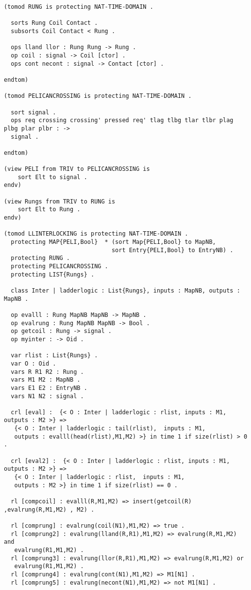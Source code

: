 \documentclass{article}
\begin{document}
\begin{verbatim}
(tomod RUNG is protecting NAT-TIME-DOMAIN .
  
  sorts Rung Coil Contact .
  subsorts Coil Contact < Rung .

  ops lland llor : Rung Rung -> Rung .
  op coil : signal -> Coil [ctor] .
  ops cont necont : signal -> Contact [ctor] .

endtom)

(tomod PELICANCROSSING is protecting NAT-TIME-DOMAIN .
 
  sort signal .
  ops req crossing crossing' pressed req' tlag tlbg tlar tlbr plag plbg plar plbr : -> 
  signal .

endtom)

(view PELI from TRIV to PELICANCROSSING is
    sort Elt to signal .
endv)

(view Rungs from TRIV to RUNG is
    sort Elt to Rung .
endv)

(tomod LLINTERLOCKING is protecting NAT-TIME-DOMAIN . 
  protecting MAP{PELI,Bool}  * (sort Map{PELI,Bool} to MapNB,
                               sort Entry{PELI,Bool} to EntryNB) .
  protecting RUNG .
  protecting PELICANCROSSING .
  protecting LIST{Rungs} .

  class Inter | ladderlogic : List{Rungs}, inputs : MapNB, outputs : MapNB .
  
  op evalll : Rung MapNB MapNB -> MapNB .
  op evalrung : Rung MapNB MapNB -> Bool .
  op getcoil : Rung -> signal .  
  op myinter : -> Oid .

  var rlist : List{Rungs} .
  var O : Oid .
  vars R R1 R2 : Rung .
  vars M1 M2 : MapNB .
  vars E1 E2 : EntryNB .
  vars N1 N2 : signal .

  crl [eval] :  {< O : Inter | ladderlogic : rlist, inputs : M1, outputs : M2 >} => 
   {< O : Inter | ladderlogic : tail(rlist),  inputs : M1, 
   outputs : evalll(head(rlist),M1,M2) >} in time 1 if size(rlist) > 0 .

  crl [eval2] :  {< O : Inter | ladderlogic : rlist, inputs : M1, outputs : M2 >} => 
   {< O : Inter | ladderlogic : rlist,  inputs : M1, 
   outputs : M2 >} in time 1 if size(rlist) == 0 .
  
  rl [compcoil] : evalll(R,M1,M2) => insert(getcoil(R) ,evalrung(R,M1,M2) , M2) .
  
  rl [comprung] : evalrung(coil(N1),M1,M2) => true .
  rl [comprung2] : evalrung(lland(R,R1),M1,M2) => evalrung(R,M1,M2) and 
   evalrung(R1,M1,M2) .
  rl [comprung3] : evalrung(llor(R,R1),M1,M2) => evalrung(R,M1,M2) or
   evalrung(R1,M1,M2) .
  rl [comprung4] : evalrung(cont(N1),M1,M2) => M1[N1] .
  rl [comprung5] : evalrung(necont(N1),M1,M2) => not M1[N1] .


\end{verbatim}
\end{document}
